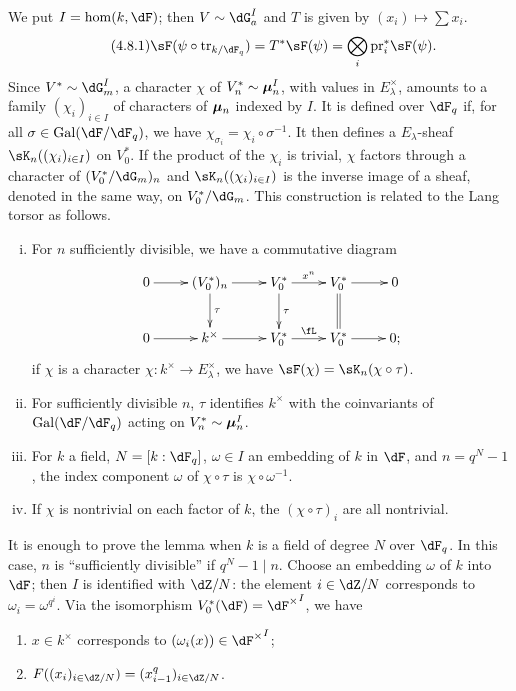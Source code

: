 We put $I=\hom(k,\dF)$; then $V\sim \dG_a^I$ and $T$ is given by 
$(x_i)\mapsto \sum x_i$. 
\begin{equation*}\tag{4.8.1}\label{VI:eq:4-8-1}
  \sF(\psi\circ \tr_{k/\dF_q}) = T^\ast \sF(\psi) = \bigotimes_i \pr_i^\ast \sF(\psi) \text{.} 
\end{equation*}
Since $V^\ast\sim \dG_m^I$, a character $\chi$ of $V_n^\ast\sim {\bm\mu}_n^I$, 
with values in $E_\lambda^\times$, amounts to a family 
$(\chi_i)_{i\in I}$ of characters of ${\bm\mu}_n$ indexed by $I$. It is 
defined over $\dF_q$ if, for all $\sigma\in \gal(\dF/\dF_q)$, we have 
$\chi_{\sigma_i} = \chi_i\circ \sigma^{-1}$. It then defines a 
$E_\lambda$-sheaf $\sK_n((\chi_i)_{i\in I})$ on $V_0^\ast$. If the product 
of the $\chi_i$ is trivial, $\chi$ factors through a character of 
$(V_0^\ast/\dG_m)_n$ and $\sK_n((\chi_i)_{i\in I})$ is the inverse image 
of a sheaf, denoted in the same way, on $V_0^\ast/\dG_m$. This construction 
is related to the Lang torsor as follows. 





\begin{lemma_}\label{VI:4-9}
\begin{enumerate}[(i)]
  \item For $n$ sufficiently divisible, we have a commutative diagram 
    \[\xymatrix{
      0 \ar[r] 
        & (V_0^\ast)_n \ar[r] \ar[d]^-\tau 
        & V_0^\ast \ar[r]^-{x^n} \ar[d]^-\tau 
        & V_0^\ast \ar[r] \ar@{=}[d] 
        & 0 \\
      0 \ar[r] 
        & k^\times \ar[r] 
        & V_0^\ast \ar[r]^-\fL 
        & V_0^\ast \ar[r] 
        & 0 \text{;} 
    }\]
    if $\chi$ is a character $\chi:k^\times \to E_\lambda^\times$, we have 
    $\sF(\chi) = \sK_n(\chi\circ\tau)$. 
  \item For sufficiently divisible $n$, $\tau$ identifies $k^\times$ with the coinvariants 
    of $\gal(\dF/\dF_q)$ acting on $V_n^\ast\sim {\bm\mu}_n^I$. 
  \item For $k$ a field, $N=[k:\dF_q]$, $\omega\in I$ an embedding of $k$ 
    in $\dF$, and $n=q^N-1$, the index component $\omega$ of 
    $\chi\circ\tau$ is $\chi\circ \omega^{-1}$. 
  \item If $\chi$ is nontrivial on each factor of $k$, the 
    $(\chi\circ \tau)_i$ are all nontrivial. 
\end{enumerate}
\end{lemma_}

It is enough to prove the lemma when $k$ is a field of degree $N$ over 
$\dF_q$. In this case, $n$ is ``sufficiently divisible'' if $q^N-1\mid n$. 
Choose an embedding $\omega$ of $k$ into $\dF$; then $I$ is identified 
with $\dZ/N$: the element $i\in \dZ/N$ corresponds to $\omega_i=\omega^{q^i}$. Via 
the isomorphism $V_0^\ast(\dF) = {\dF^\times}^I$, we have 
\begin{enumerate}[\indent a)]
  \item $x\in k^\times$ corresponds to $(\omega_i(x))\in {\dF^\times}^I$; 
  \item $F((x_i)_{i\in \dZ/N})=(x_{i-1}^q)_{i\in \dZ/N}$. 
\end{enumerate}

